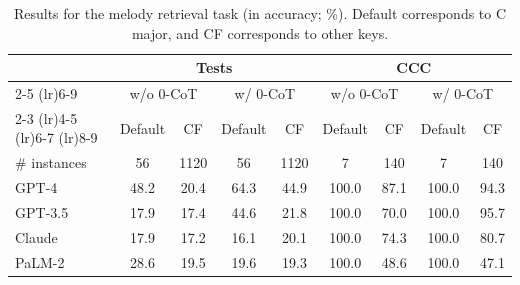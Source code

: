\begin{table}[t!]
    \centering
    \begin{tabular}{lcccccccc}
        \toprule
        & \multicolumn{4}{c}{Tests} & \multicolumn{4}{c}{CCC} \\
        \cmidrule(lr){2-5}
        \cmidrule(lr){6-9}
        & \multicolumn{2}{c}{w/o 0-CoT} & \multicolumn{2}{c}{w/ 0-CoT} & \multicolumn{2}{c}{w/o 0-CoT} & \multicolumn{2}{c}{w/ 0-CoT} \\
        \cmidrule(lr){2-3}
        \cmidrule(lr){4-5}
        \cmidrule(lr){6-7}
        \cmidrule(lr){8-9} 
        & Default & CF & Default & CF & Default & CF & Default & CF \\
        \midrule
        \# instances & 56 & 1120 & 56 & 1120 & 7 & 140 & 7 & 140 \\
        \midrule
        GPT-4 & 48.2 & 20.4 & 64.3 & 44.9 & 100.0 & 87.1 & 100.0 & 94.3\\
        GPT-3.5 & 17.9 & 17.4 & 44.6 & 21.8 & 100.0 & 70.0 & 100.0 & 95.7\\
        Claude & 17.9 & 17.2 & 16.1 & 20.1 & 100.0 & 74.3 & 100.0 & 80.7\\
        PaLM-2 & 28.6 & 19.5 & 19.6 & 19.3 & 100.0 & 48.6 & 100.0 & 47.1\\
        \bottomrule
    \end{tabular}
    \caption{
    Results for the melody retrieval task (in accuracy; \%). Default corresponds to C major, and CF corresponds to other keys.}
\end{table}


